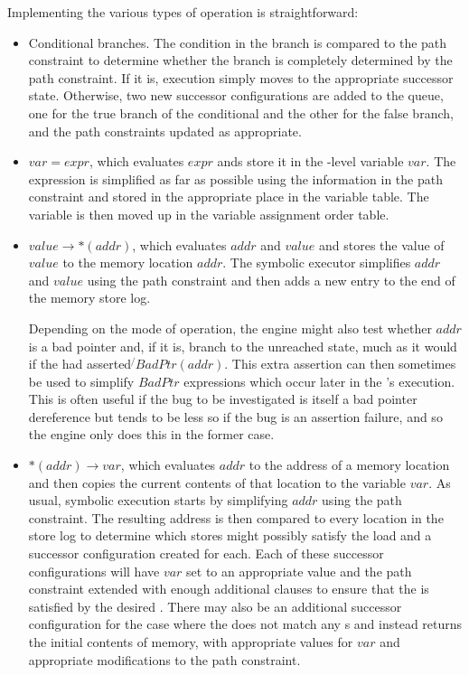 Implementing the various types of \StateMachine operation is
straightforward:

\begin{itemize}
\item Conditional branches.  The condition in the branch is compared
  to the path constraint to determine whether the branch is completely
  determined by the path constraint.  If it is, execution simply moves
  to the appropriate successor state.  Otherwise, two new successor
  configurations are added to the queue, one for the true branch of
  the conditional and the other for the false branch, and the path
  constraints updated as appropriate.
\item {} $var = expr$, which evaluates $expr$ ands store it
  in the {\StateMachine}-level variable $var$.  The expression is
  simplified as far as possible using the information in the path
  constraint and stored in the appropriate place in the variable
  table.  The variable is then moved up in the variable assignment
  order table.
\item {} $value \rightarrow \ast(addr)$, which evaluates
  $addr$ and $value$ and stores the value of $value$ to the memory
  location $addr$.  The symbolic executor simplifies $addr$ and
  $value$ using the path constraint and then adds a new entry to the
  end of the memory store log.

  Depending on the mode of operation, the engine might also test
  whether $addr$ is a bad pointer and, if it is, branch to the
  unreached state, much as it would if the {\StateMachine} had
  asserted $\not{}BadPtr(addr)$.  This extra assertion can then
  sometimes be used to simplify $BadPtr$ expressions which occur later
  in the {\StateMachine}'s execution.  This is often useful if the bug
  to be investigated is itself a bad pointer dereference but tends to
  be less so if the bug is an assertion failure, and so the engine
  only does this in the former case.

\item {} $\ast(addr) \rightarrow var$, which evaluates
  $addr$ to the address of a memory location and then copies the
  current contents of that location to the {\StateMachine} variable
  $var$.  As usual, symbolic execution starts by simplifying $addr$
  using the path constraint.  The resulting address is then compared
  to every location in the store log to determine which stores might
  possibly satisfy the load and a successor configuration created for
  each.  Each of these successor configurations will have $var$ set to
  an appropriate value and the path constraint extended with enough
  additional clauses to ensure that the  is satisfied by
  the desired .  There may also be an additional
  successor configuration for the case where the  does not
  match any s and instead returns the initial contents of
  memory, with appropriate values for $var$ and appropriate
  modifications to the path constraint.


\end{itemize}
